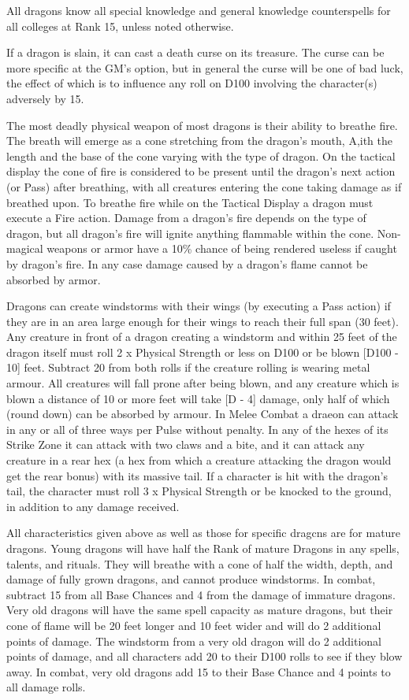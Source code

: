 \begin{multicols*}{2}
All dragons know all special knowledge and general knowledge
counterspells for all colleges at Rank 15, unless noted otherwise.

If a dragon is slain, it can cast a death curse on its treasure.  The
curse can be more specific at the GM's option, but in general the
curse will be one of bad luck, the effect of which is to influence any
roll on D100 involving the character(s) adversely by 15.

The most deadly physical weapon of most dragons is their ability to
breathe fire. The breath will emerge as a cone stretching from the
dragon's mouth, A,ith the length and the base of the cone varying with
the type of dragon.  On the tactical display the cone of fire is
considered to be present until the dragon's next action (or Pass)
after breathing, with all creatures entering the cone taking damage as
if breathed upon.  To breathe fire while on the Tactical Display a
dragon must execute a Fire action.  Damage from a dragon's fire
depends on the type of dragon, but all dragon's fire will ignite
anything flammable within the cone.  Non-magical weapons or armor have
a 10\% chance of being rendered useless if caught by dragon's fire.  In
any case damage caused by a dragon's flame cannot be absorbed by
armor.

Dragons can create windstorms with their wings (by executing a Pass
action) if they are in an area large enough for their wings to reach
their full span (30 feet).  Any creature in front of a dragon creating
a windstorm and within 25 feet of the dragon itself must roll 2 x
Physical Strength or less on D100 or be blown [D100 - 10] feet.
Subtract 20 from both rolls if the creature rolling is wearing metal
armour.  All creatures will fall prone after being blown, and any
creature which is blown a distance of 10 or more feet will take [D -
4] damage, only half of which (round down) can be absorbed by armour.
In Melee Combat a draeon can attack in any or all of three ways per
Pulse without penalty.  In any of the hexes of its Strike Zone it can
attack with two claws and a bite, and it can attack any creature in a
rear hex (a hex from which a creature attacking the dragon would get
the rear bonus) with its massive tail.  If a character is hit with the
dragon's tail, the character must roll 3 x Physical Strength or be
knocked to the ground, in addition to any damage received.

All characteristics given above as well as those for specific dragcns
are for mature dragons.  Young dragons will have half the Rank of
mature Dragons in any spells, talents, and rituals.  They will breathe
with a cone of half the width, depth, and damage of fully grown
dragons, and cannot produce windstorms.  In combat, subtract 15 from
all Base Chances and 4 from the damage of immature dragons.  Very old
dragons will have the same spell capacity as mature dragons, but their
cone of flame will be 20 feet longer and 10 feet wider and will do 2
additional points of damage.  The windstorm from a very old dragon
will do 2 additional points of damage, and all characters add 20 to
their D100 rolls to see if they blow away.  In combat, very old
dragons add 15 to their Base Chance and 4 points to all damage rolls.


\end{multicols*}
